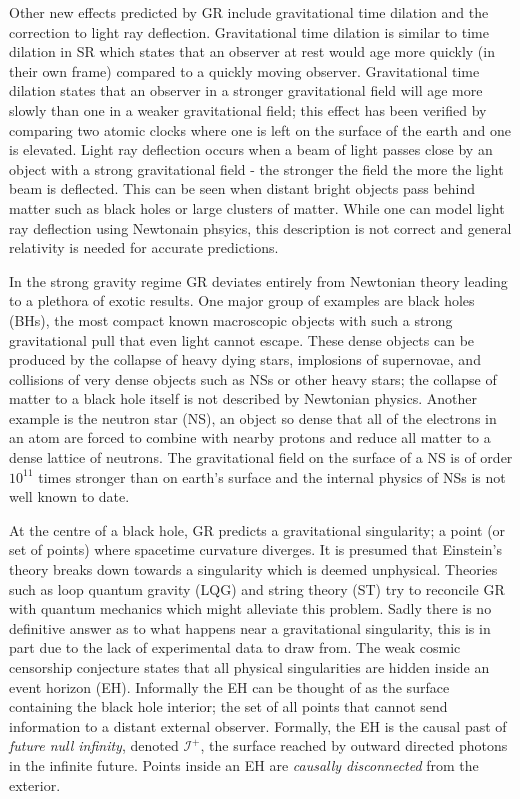 Other new effects predicted by GR include gravitational time dilation and the correction to light ray deflection. Gravitational time dilation is similar to time dilation in SR which states that an observer at rest would age more quickly (in their own frame) compared to a quickly moving observer. Gravitational time dilation states that an observer in a stronger gravitational field will age more slowly than one in a weaker gravitational field; this effect has been verified by comparing two atomic clocks where one is left on the surface of the earth and one is elevated. Light ray deflection occurs when a beam of light passes close by an object with a strong gravitational field - the stronger the field the more the light beam is deflected. This can be seen when distant bright objects pass behind matter such as black holes or large clusters of matter. While one can model light ray deflection using Newtonain phsyics, this description is not correct and general relativity is needed for accurate predictions.

In the strong gravity regime GR deviates entirely from Newtonian theory leading to a plethora of exotic results. One major group of examples are black holes (BHs), the most compact known macroscopic objects with such a strong gravitational pull that even light cannot escape. These dense objects can be produced by the collapse of heavy dying stars, implosions of supernovae, and collisions of very dense objects such as NSs or other heavy stars; the collapse of matter to a black hole itself is not described by Newtonian physics. Another example is the neutron star (NS), an object so dense that all of the electrons in an atom are forced to combine with nearby protons and reduce all matter to a dense lattice of neutrons. The gravitational field on the surface of a NS is of order $10^{11}$ times stronger than on earth's surface and the internal physics of NSs is not well known to date.

At the centre of a black hole, GR predicts a gravitational singularity; a point (or set of points) where spacetime curvature diverges. It is presumed that Einstein's theory breaks down towards a singularity which is deemed unphysical. Theories such as loop quantum gravity (LQG) and string theory (ST) try to reconcile GR with quantum mechanics which might alleviate this problem. Sadly there is no definitive answer as to what happens near a gravitational singularity, this is in part due to the lack of experimental data to draw from. The weak cosmic censorship conjecture states that all physical singularities are hidden inside an event horizon (EH). Informally the EH can be thought of as the surface containing the black hole interior; the set of all points that cannot send information to a distant external observer. Formally, the EH is the causal past of {\it future null infinity}, denoted $\mathcal{I}^+$, the surface reached by outward directed photons in the infinite future. Points inside an EH are {\it causally disconnected} from the exterior.

